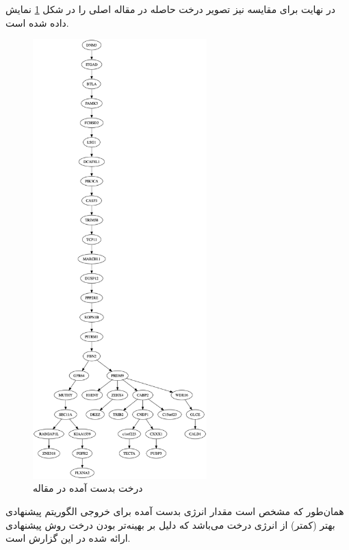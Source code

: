 در نهایت برای مقایسه نیز تصویر درخت حاصله در مقاله اصلی  را در شکل \ref{fig:Gene_SCITE} نمایش داده شده است.
\begin{figure}[!ht]
	\centering
	\includegraphics[width=0.6\textwidth]{img/res/SCITE}
	\caption{درخت بدست آمده در مقاله }
	\label{fig:Gene_SCITE}
\end{figure}
همان‌طور که مشخص است مقدار انرژی بدست آمده برای خروجی الگوریتم پیشنهادی بهتر (کمتر) از انرژی درخت  می‌باشد که دلیل بر بهینه‌تر بودن درخت روش پیشنهادی ارائه شده در این گزارش است.


